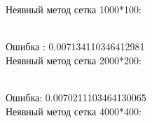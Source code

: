 \documentclass[12pt]{article}
\begin{document}
\begin{enumerate}
        Неявный метод сетка 1000*100: 
        \begin{figure}[!h]
            \label{ris:image}
        \end{figure}\\
  \newpage
        Ошибка : 0.007134110346412981
        \\Неявный метод сетка 2000*200: 
        \begin{figure}[h]
            \label{ris:image}
        \end{figure}\\
        Ошибка: 0.0070211103464130065 
        \\Неявный метод сетка 4000*400: 
        \begin{figure}[h]
            \label{ris:image}
        \end{figure}\\
        

\end{enumerate}
\end{document}
